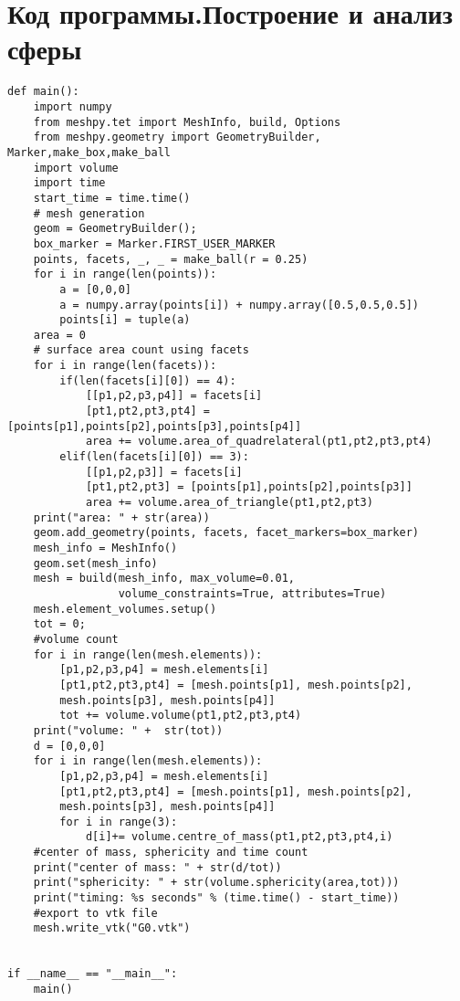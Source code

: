 \section*{\centering Код программы.Построение и анализ сферы}
\begin{footnotesize}
\begin{lstlisting}
def main():
    import numpy
    from meshpy.tet import MeshInfo, build, Options
    from meshpy.geometry import GeometryBuilder, Marker,make_box,make_ball
    import volume
    import time
    start_time = time.time()
    # mesh generation
    geom = GeometryBuilder();
    box_marker = Marker.FIRST_USER_MARKER
    points, facets, _, _ = make_ball(r = 0.25)
    for i in range(len(points)):
        a = [0,0,0]
        a = numpy.array(points[i]) + numpy.array([0.5,0.5,0.5])
        points[i] = tuple(a)
    area = 0
    # surface area count using facets
    for i in range(len(facets)):
        if(len(facets[i][0]) == 4):   
            [[p1,p2,p3,p4]] = facets[i]
            [pt1,pt2,pt3,pt4] = [points[p1],points[p2],points[p3],points[p4]]
            area += volume.area_of_quadrelateral(pt1,pt2,pt3,pt4)
        elif(len(facets[i][0]) == 3):
            [[p1,p2,p3]] = facets[i]
            [pt1,pt2,pt3] = [points[p1],points[p2],points[p3]]
            area += volume.area_of_triangle(pt1,pt2,pt3)
    print("area: " + str(area))
    geom.add_geometry(points, facets, facet_markers=box_marker)
    mesh_info = MeshInfo()
    geom.set(mesh_info)
    mesh = build(mesh_info, max_volume=0.01,
                 volume_constraints=True, attributes=True)
    mesh.element_volumes.setup()
    tot = 0;
    #volume count
    for i in range(len(mesh.elements)):
        [p1,p2,p3,p4] = mesh.elements[i]
        [pt1,pt2,pt3,pt4] = [mesh.points[p1], mesh.points[p2],
        mesh.points[p3], mesh.points[p4]]
        tot += volume.volume(pt1,pt2,pt3,pt4)
    print("volume: " +  str(tot))
    d = [0,0,0]
    for i in range(len(mesh.elements)):
        [p1,p2,p3,p4] = mesh.elements[i]
        [pt1,pt2,pt3,pt4] = [mesh.points[p1], mesh.points[p2],
        mesh.points[p3], mesh.points[p4]]
        for i in range(3):
            d[i]+= volume.centre_of_mass(pt1,pt2,pt3,pt4,i)
    #center of mass, sphericity and time count
    print("center of mass: " + str(d/tot))
    print("sphericity: " + str(volume.sphericity(area,tot)))
    print("timing: %s seconds" % (time.time() - start_time))
    #export to vtk file
    mesh.write_vtk("G0.vtk")
    

if __name__ == "__main__":
    main()
\end{lstlisting}
\end{footnotesize}

